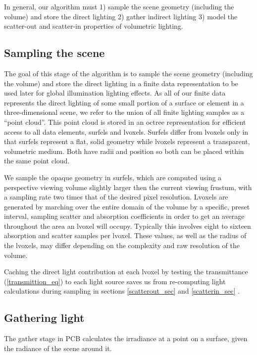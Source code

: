 \documentclass[runningheads]{llncs}
\begin{document}
In general, our algorithm must 1) sample the scene geometry (including the volume) and store the direct lighting 2) gather indirect lighting 3) model the scatter-out and scatter-in properties of volumetric lighting.

\subsection{Sampling the scene}
The goal of this stage of the algorithm is to sample the scene geometry (including the volume) and store the direct lighting in a finite data representation to be used later for global illumination lighting effects.  As all of our finite data represents the direct lighting of some small portion of a surface or element in a three-dimensional scene, we refer to the union of all finite lighting samples as a ``point cloud''.  This point cloud is stored in an octree representation for efficient access to all data elements, surfels and lvoxels.  Surfels differ from lvoxels only in that surfels represent a flat, solid geometry while lvoxels represent a transparent, volumetric medium.  Both have radii and position so both can be placed within the same point cloud.  

We sample the opaque geometry in surfels, which are computed using a perspective viewing volume slightly larger then the current viewing frustum, with a sampling rate two times that of the desired pixel resolution.  Lvoxels are generated by marching over the entire domain of the volume by a specific, preset interval, sampling scatter and absorption coefficients in order to get an average throughout the area an lvoxel will occupy.  Typically this involves eight to sixteen absorption and scatter samples per lvoxel.  These values, as well as the radius of the lvoxels, may differ depending on the complexity and raw resolution of the volume.

Caching the direct light contribution at each lvoxel by testing the transmittance (\ref{transmittion_eq}) to each light source saves us from re-computing light calculations during sampling in sections \ref{scatterout_sec} and \ref{scatterin_sec} \cite{signotes:2010}.


\subsection{Gathering light}

The gather stage in PCB calculates the irradiance at a point on a surface, given the radiance of the scene around it.
\end{document}

